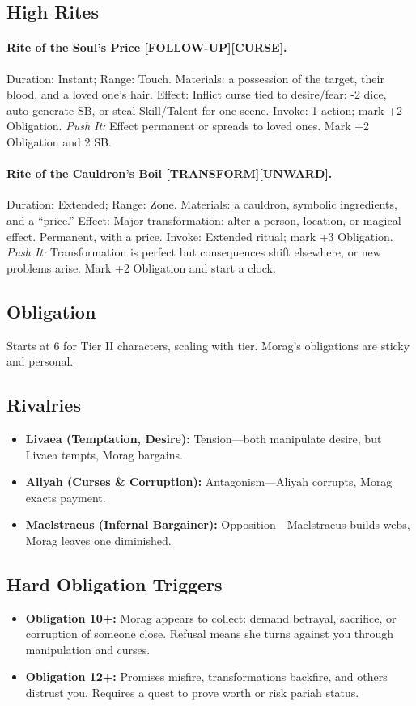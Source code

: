 \documentclass[11pt]{article}
\begin{document}
\subsection*{High Rites}
\paragraph{Rite of the Soul's Price [FOLLOW-UP][CURSE].} Duration: Instant; Range: Touch.  
Materials: a possession of the target, their blood, and a loved one’s hair.  
Effect: Inflict curse tied to desire/fear: -2 dice, auto-generate SB, or steal Skill/Talent for one scene.  
Invoke: 1 action; mark +2 Obligation.  
\emph{Push It:} Effect permanent or spreads to loved ones. Mark +2 Obligation and 2 SB.  

\paragraph{Rite of the Cauldron's Boil [TRANSFORM][UNWARD].} Duration: Extended; Range: Zone.  
Materials: a cauldron, symbolic ingredients, and a ``price.''  
Effect: Major transformation: alter a person, location, or magical effect. Permanent, with a price.  
Invoke: Extended ritual; mark +3 Obligation.  
\emph{Push It:} Transformation is perfect but consequences shift elsewhere, or new problems arise. Mark +2 Obligation and start a clock.

\subsection*{Obligation}
Starts at 6 for Tier II characters, scaling with tier. Morag’s obligations are sticky and personal.

\subsection*{Rivalries}
\begin{itemize}
  \item \textbf{Livaea (Temptation, Desire):} Tension---both manipulate desire, but Livaea tempts, Morag bargains.  
  \item \textbf{Aliyah (Curses \& Corruption):} Antagonism---Aliyah corrupts, Morag exacts payment.  
  \item \textbf{Maelstraeus (Infernal Bargainer):} Opposition---Maelstraeus builds webs, Morag leaves one diminished.  
\end{itemize}

\subsection*{Hard Obligation Triggers}
\begin{itemize}
  \item \textbf{Obligation 10+:} Morag appears to collect: demand betrayal, sacrifice, or corruption of someone close. Refusal means she turns against you through manipulation and curses.  
  \item \textbf{Obligation 12+:} Promises misfire, transformations backfire, and others distrust you. Requires a quest to prove worth or risk pariah status.  
\end{itemize}
\end{document}

